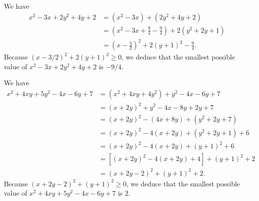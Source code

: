 We have
\begin{align*}
	x^2 - 3 x + 2 y^2 + 4 y + 2 & = (x^2 - 3 x) + (2 y ^2 + 4 y + 2)                                        \\
	                            & = \left( x^2 - 3 x + \frac{9}{4} - \frac{9}{4} \right) + 2(y^2 + 2 y + 1) \\
	                            & = \left( x - \frac{3}{2} \right)^2 + 2(y + 1)^2 - \frac{9}{4}.
\end{align*}
Because $(x - 3/2)^2 + 2(y + 1)^2 \geq 0$, we deduce that the smallest possible value of ${x^2 - 3 x + 2 y^2 + 4 y + 2}$ is $-9/4$.

We have
\begin{align*}
	x^2 + 4 x y + 5 y^2 - 4 x - 6 y + 7 & = (x^2 + 4 x y + 4 y^2) + y^2 - 4 x - 6 y + 7                  \\
	                                    & = (x + 2 y)^2 + y^2 - 4 x - 8 y + 2 y + 7                      \\
	                                    & = (x + 2 y)^2 - (4 x + 8 y) + (y^2 + 2 y + 7)                  \\
	                                    & = (x + 2 y)^2 - 4 (x + 2 y) + (y^2 + 2 y + 1) + 6              \\
	                                    & = (x + 2 y)^2 - 4 (x + 2 y) + (y + 1)^2 + 6                    \\
	                                    & = \left[ (x + 2 y)^2 - 4 (x + 2 y) + 4 \right] + (y + 1)^2 + 2 \\
	                                    & = (x + 2 y - 2)^2 + (y + 1)^2 + 2.
\end{align*}
Because $(x + 2y - 2)^2 + (y + 1)^2 \geq 0$, we deduce that the smallest possible value of $x^2 + 4 x y + 5 y^2 - 4 x - 6 y + 7$ is $2$.


